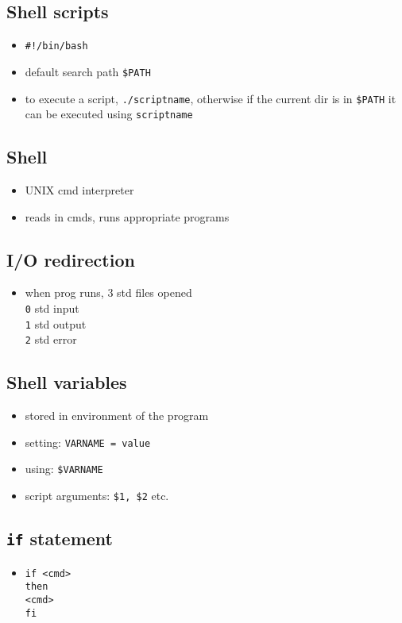 \documentclass[10pt, multicolumn, a4paper]{article}
\begin{document}
\begin{multicols}{2}
	\subsection*{Shell scripts}
	\begin{itemize}
	\item \verb|#!/bin/bash|
	\item default search path \verb|$PATH|
	\item to execute a script, \verb|./scriptname|, otherwise if the current dir is in \verb|$PATH| it can be executed using \verb|scriptname|
	\end{itemize}
	\subsection*{Shell}
	\begin{itemize}
	\item UNIX cmd interpreter
	\item reads in cmds, runs appropriate programs
	\end{itemize}
	\subsection*{I/O redirection}
	\begin{itemize}
	\item when prog runs, 3 std files opened 
		\\ \verb|0| std input \\ \verb|1| std output \\ \verb|2| std error
	\end{itemize}
	\subsection*{Shell variables}
	\begin{itemize}
	\item stored in environment of the program
	\item setting: \verb|VARNAME = value|
	\item using: \verb|$VARNAME|
	\item script arguments: \verb|$1, $2| etc.
	\end{itemize}
	\subsection*{\texttt{if} statement}
	\begin{itemize}
	\item \texttt{if <cmd> \\ then \\ \hspace*{5mm} <cmd> \\ fi}
	\end{itemize}

\end{multicols}
\end{document}
